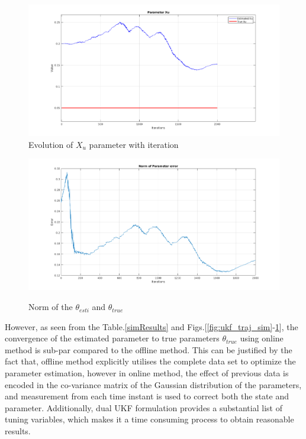 \documentclass[12pt,titlepage]{article}
\begin{document}
\begin{figure}[H]
\begin{minipage}{.5\textwidth}
  \centering
    \includegraphics[width=0.9\columnwidth]{Images/Xu_param_plot.png}\\
    \caption{Evolution of $X_u$ parameter with iteration}
    \label{fig:ukf_xu}
    \end{minipage}%
\begin{minipage}{.5\textwidth}
  \centering
    \includegraphics[width=0.9\columnwidth]{Images/Norm_param.png}\\
    \caption{Norm of the $\theta_{esti}$ and $\theta_{true}$}
    \label{fig:norm}
    \end{minipage}%
\end{figure}
However, as seen from the Table.\ref{simResults} and Figs.[\ref{fig:ukf_traj_sim}-\ref{fig:norm}], the convergence of the estimated parameter to true parameters $\theta_{true}$ using online method is sub-par compared to the offline method. This can be justified by the fact that, offline method explicitly utilises the complete data set to optimize the parameter estimation, however in online method, the effect of previous data is encoded in the co-variance matrix of the Gaussian distribution of the parameters, and measurement from each time instant is used to correct both the state and parameter. Additionally, dual UKF formulation provides a substantial list of tuning variables, which makes it a time consuming process to obtain reasonable results. 
\end{document}
